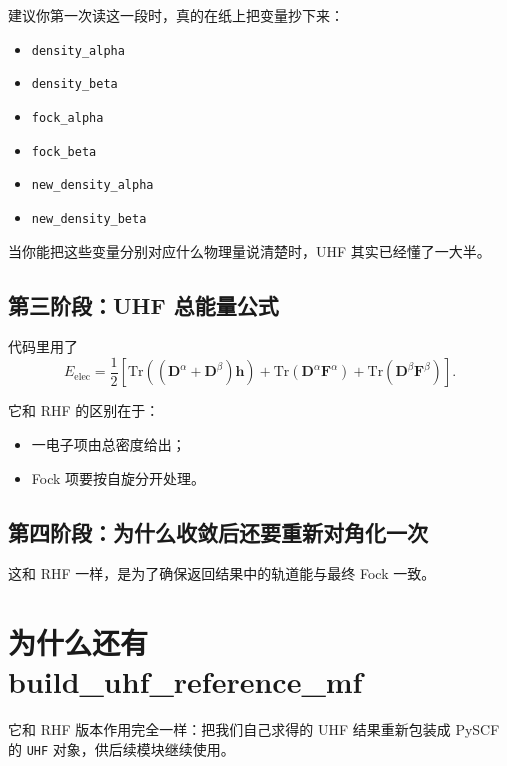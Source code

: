 \documentclass[UTF8,11pt,fontset=fandol]{ctexbook}
\begin{document}
建议你第一次读这一段时，真的在纸上把变量抄下来：
\begin{itemize}
  \item \texttt{density\_alpha}
  \item \texttt{density\_beta}
  \item \texttt{fock\_alpha}
  \item \texttt{fock\_beta}
  \item \texttt{new\_density\_alpha}
  \item \texttt{new\_density\_beta}
\end{itemize}

当你能把这些变量分别对应什么物理量说清楚时，UHF 其实已经懂了一大半。

\subsection*{第三阶段：UHF 总能量公式}

代码里用了
\begin{equation}
E_{\mathrm{elec}}
=
\frac{1}{2}
\left[
\mathrm{Tr}\left((\mathbf{D}^{\alpha}+\mathbf{D}^{\beta})\mathbf{h}\right)
+
\mathrm{Tr}\left(\mathbf{D}^{\alpha}\mathbf{F}^{\alpha}\right)
+
\mathrm{Tr}\left(\mathbf{D}^{\beta}\mathbf{F}^{\beta}\right)
\right].
\end{equation}

它和 RHF 的区别在于：
\begin{itemize}
  \item 一电子项由总密度给出；
  \item Fock 项要按自旋分开处理。
\end{itemize}

\subsection*{第四阶段：为什么收敛后还要重新对角化一次}

这和 RHF 一样，是为了确保返回结果中的轨道能与最终 Fock 一致。

\section{为什么还有 build\_uhf\_reference\_mf}



它和 RHF 版本作用完全一样：把我们自己求得的 UHF 结果重新包装成 PySCF 的 \texttt{UHF} 对象，供后续模块继续使用。
\end{document}
